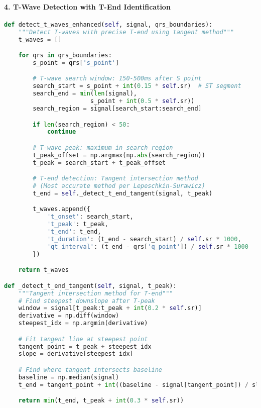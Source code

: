 \documentclass[11pt]{article}
\begin{document}
\paragraph{4. T-Wave Detection with T-End Identification}
\begin{lstlisting}[language=Python, caption=T-Wave and T-End Detection]
def detect_t_waves_enhanced(self, signal, qrs_boundaries):
    """Detect T-waves with precise T-end using tangent method"""
    t_waves = []

    for qrs in qrs_boundaries:
        s_point = qrs['s_point']

        # T-wave search window: 150-500ms after S point
        search_start = s_point + int(0.15 * self.sr)  # ST segment
        search_end = min(len(signal),
                        s_point + int(0.5 * self.sr))
        search_region = signal[search_start:search_end]

        if len(search_region) < 50:
            continue

        # T-wave peak: maximum in search region
        t_peak_offset = np.argmax(np.abs(search_region))
        t_peak = search_start + t_peak_offset

        # T-end detection: Tangent intersection method
        # (Most accurate method per Lepeschkin-Surawicz)
        t_end = self._detect_t_end_tangent(signal, t_peak)

        t_waves.append({
            't_onset': search_start,
            't_peak': t_peak,
            't_end': t_end,
            't_duration': (t_end - search_start) / self.sr * 1000,
            'qt_interval': (t_end - qrs['q_point']) / self.sr * 1000
        })

    return t_waves

def _detect_t_end_tangent(self, signal, t_peak):
    """Tangent intersection method for T-end"""
    # Find steepest downslope after T-peak
    window = signal[t_peak:t_peak + int(0.2 * self.sr)]
    derivative = np.diff(window)
    steepest_idx = np.argmin(derivative)

    # Fit tangent line at steepest point
    tangent_point = t_peak + steepest_idx
    slope = derivative[steepest_idx]

    # Find where tangent intersects baseline
    baseline = np.median(signal)
    t_end = tangent_point + int((baseline - signal[tangent_point]) / slope)

    return min(t_end, t_peak + int(0.3 * self.sr))
\end{lstlisting}
\end{document}
